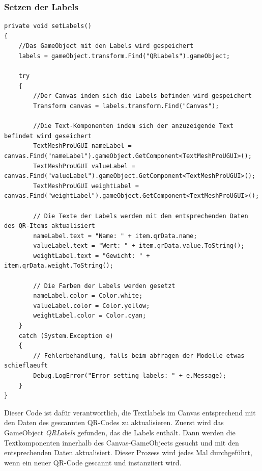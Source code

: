 \subsubsection*{Setzen der Labels}
\begin{lstlisting}[style=csharp, caption={Setzen der Labels}, label=code:labels]
private void setLabels()
{
    //Das GameObject mit den Labels wird gespeichert
    labels = gameObject.transform.Find("QRLabels").gameObject;

    try
    {
        //Der Canvas indem sich die Labels befinden wird gespeichert
        Transform canvas = labels.transform.Find("Canvas");

        //Die Text-Komponenten indem sich der anzuzeigende Text befindet wird geseichert
        TextMeshProUGUI nameLabel = canvas.Find("nameLabel").gameObject.GetComponent<TextMeshProUGUI>();
        TextMeshProUGUI valueLabel = canvas.Find("valueLabel").gameObject.GetComponent<TextMeshProUGUI>();
        TextMeshProUGUI weightLabel = canvas.Find("weightLabel").gameObject.GetComponent<TextMeshProUGUI>();

        // Die Texte der Labels werden mit den entsprechenden Daten des QR-Items aktualisiert
        nameLabel.text = "Name: " + item.qrData.name;
        valueLabel.text = "Wert: " + item.qrData.value.ToString();
        weightLabel.text = "Gewicht: " + item.qrData.weight.ToString();

        // Die Farben der Labels werden gesetzt
        nameLabel.color = Color.white;
        valueLabel.color = Color.yellow;
        weightLabel.color = Color.cyan;
    }
    catch (System.Exception e)
    {
        // Fehlerbehandlung, falls beim abfragen der Modelle etwas schieflaeuft
        Debug.LogError("Error setting labels: " + e.Message);
    }
}
\end{lstlisting}

Dieser Code ist dafür verantwortlich, die Textlabels im Canvas entsprechend mit den Daten des gescannten QR-Codes zu aktualisieren. Zuerst wird das GameObject \textit{QRLabels} gefunden, das die Labels enthält. Dann werden die Textkomponenten innerhalb des Canvas-GameObjects gesucht und mit den entsprechenden Daten aktualisiert. Dieser Prozess wird jedes Mal durchgeführt, wenn ein neuer QR-Code gescannt und instanziiert wird.

